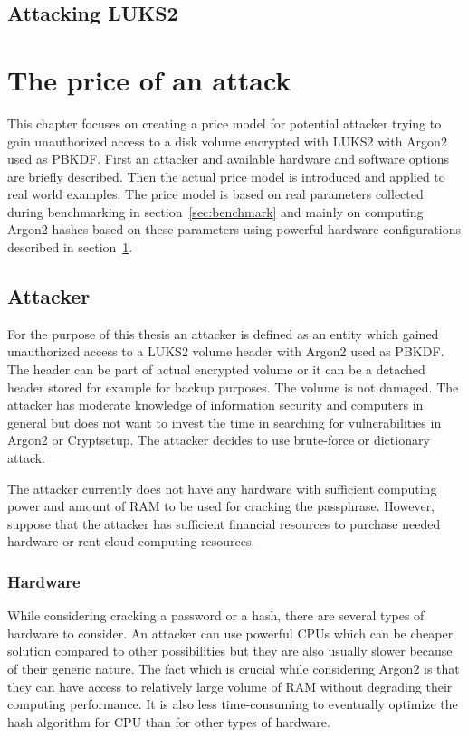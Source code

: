 \documentclass[nolof]{fithesis3}
\begin{document}
\section{Attacking LUKS2}
\label{sec:attack}


\chapter{The price of an attack}
\label{chap:model}
This chapter focuses on creating a price model for potential attacker trying to gain unauthorized access to a disk volume encrypted with LUKS2 with Argon2 used as PBKDF. First an attacker and available hardware and software options are briefly described. Then the actual price model is introduced and applied to real world examples. The price model is based on real parameters collected during benchmarking in section~\ref{sec:benchmark} and mainly on computing Argon2 hashes based on these parameters using powerful hardware configurations described in section~\ref{sec:attack}.

\section{Attacker}
For the purpose of this thesis an attacker is defined as an entity which gained unauthorized access to a LUKS2 volume header with Argon2 used as PBKDF. The header can be part of actual encrypted volume or it can be a detached header stored for example for backup purposes. The volume is not damaged. The attacker has moderate knowledge of information security and computers in general but does not want to invest the time in searching for vulnerabilities in Argon2 or Cryptsetup. The attacker decides to use brute-force or dictionary attack.

The attacker currently does not have any hardware with sufficient computing power and amount of RAM to be used for cracking the passphrase. However, suppose that the attacker has sufficient financial resources to purchase needed hardware or rent cloud computing resources.

\subsection{Hardware}
While considering cracking a password or a hash, there are several types of hardware to consider. An attacker can use powerful CPUs which can be cheaper solution compared to other possibilities but they are also usually slower because of their generic nature. The fact which is crucial while considering Argon2 is that they can have access to relatively large volume of RAM without degrading their computing performance. It is also less time-consuming to eventually optimize the hash algorithm for CPU than for other types of hardware.
\end{document}
